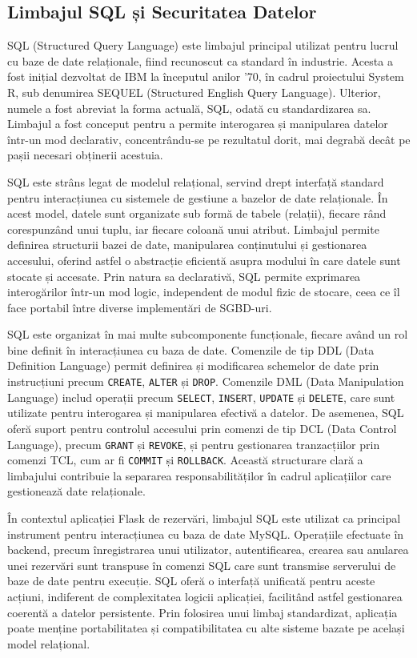 \documentclass[12pt, a4paper, oneside, romanian]{teza-upb}
\begin{document}
	\subsection{Limbajul SQL și Securitatea Datelor}
SQL (Structured Query Language) \cite{bdd} este limbajul principal utilizat pentru lucrul cu baze de date relaționale, fiind recunoscut ca standard în industrie. Acesta a fost inițial dezvoltat de IBM la începutul anilor ’70, în cadrul proiectului System R, sub denumirea SEQUEL (Structured English Query Language). Ulterior, numele a fost abreviat la forma actuală, SQL, odată cu standardizarea sa. Limbajul a fost conceput pentru a permite interogarea și manipularea datelor într-un mod declarativ, concentrându-se pe rezultatul dorit, mai degrabă decât pe pașii necesari obținerii acestuia.

SQL este strâns legat de modelul relațional, servind drept interfață standard pentru interacțiunea cu sistemele de gestiune a bazelor de date relaționale. În acest model, datele sunt organizate sub formă de tabele (relații), fiecare rând corespunzând unui tuplu, iar fiecare coloană unui atribut. Limbajul permite definirea structurii bazei de date, manipularea conținutului și gestionarea accesului, oferind astfel o abstracție eficientă asupra modului în care datele sunt stocate și accesate. Prin natura sa declarativă, SQL permite exprimarea interogărilor într-un mod logic, independent de modul fizic de stocare, ceea ce îl face portabil între diverse implementări de SGBD-uri.

SQL este organizat în mai multe subcomponente funcționale, fiecare având un rol bine definit în interacțiunea cu baza de date. Comenzile de tip DDL (Data Definition Language) permit definirea și modificarea schemelor de date prin instrucțiuni precum \texttt{CREATE}, \texttt{ALTER} și \texttt{DROP}. Comenzile DML (Data Manipulation Language) includ operații precum \texttt{SELECT}, \texttt{INSERT}, \texttt{UPDATE} și \texttt{DELETE}, care sunt utilizate pentru interogarea și manipularea efectivă a datelor. De asemenea, SQL oferă suport pentru controlul accesului prin comenzi de tip DCL (Data Control Language), precum \texttt{GRANT} și \texttt{REVOKE}, și pentru gestionarea tranzacțiilor prin comenzi TCL, cum ar fi \texttt{COMMIT} și \texttt{ROLLBACK}. Această structurare clară a limbajului contribuie la separarea responsabilităților în cadrul aplicațiilor care gestionează date relaționale.

În contextul aplicației Flask de rezervări, limbajul SQL este utilizat ca principal instrument pentru interacțiunea cu baza de date MySQL. Operațiile efectuate în backend, precum înregistrarea unui utilizator, autentificarea, crearea sau anularea unei rezervări sunt transpuse în comenzi SQL care sunt transmise serverului de baze de date pentru execuție. SQL oferă o interfață unificată pentru aceste acțiuni, indiferent de complexitatea logicii aplicației, facilitând astfel gestionarea coerentă a datelor persistente. Prin folosirea unui limbaj standardizat, aplicația poate menține portabilitatea și compatibilitatea cu alte sisteme bazate pe același model relațional.
\end{document}

